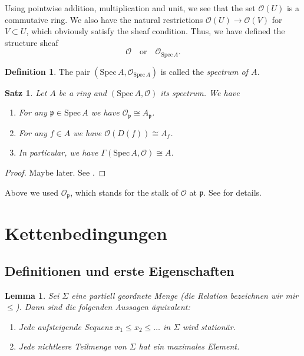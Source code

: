 \documentclass[reqno,12pt]{article}
\numberwithin{equation}{section}
\newcommand{\cO}{\mathcal{O}}
\newcommand{\Spec}{\text{Spec}\,}
\theoremstyle{plain}
\newtheorem{lemma}[thm]{Lemma}
\newtheorem{proposition}[thm]{Satz}
\theoremstyle{definition}
\newtheorem{definition}[thm]{Definition}
\newcommand{\fp}{\mathfrak{p}}
\begin{document}
Using pointwise addition, multiplication and unit, we see that the set $\cO(U)$
is a commutaive ring. We also have the natural restrictions $\cO(U) \to \cO(V)$
for $V \subset U$, which obviously satisfy the sheaf condition. Thus, we have
defined the structure sheaf
\begin{equation*}
  \cO \quad \text{or} \quad \cO_{\Spec A}.
\end{equation*}


\begin{definition}
  The pair $(\Spec A, \cO_{\Spec A})$ is called the \emph{spectrum of $A$.}
\end{definition}


\begin{proposition}\label{proposition:spec-A-structure-sheaf}
  Let $A$ be a ring and $(\Spec A, \cO)$ its spectrum. We have
  \begin{enumerate}
    \item For any $\fp \in \Spec A$ we have $\cO_{\fp} \cong A_{\fp}$.

    \item For any $f \in A$ we have $\cO(D(f)) \cong A_f$.

    \item In particular, we have $\Gamma(\Spec A, \cO) \cong A$.
  \end{enumerate}
\end{proposition}

\begin{proof}
  Maybe later. See \cite[Chapter II, Proposition 2.2]{Ha}.
\end{proof}

Above we used $\cO_{\fp}$, which stands for the stalk of $\cO$ at $\fp$.
See \cite[p.~62]{Ha} for details.

\newpage
\section{Kettenbedingungen}

\subsection{Definitionen und erste Eigenschaften}
\begin{lemma}\label{lemma-poset-chain-conditions}
Sei $\Sigma$ eine partiell geordnete Menge (die Relation bezeichnen wir mir $\leq$). Dann sind die folgenden Aussagen äquivalent:
\begin{enumerate}
\item Jede aufsteigende Sequenz $x_1 \leq x_2 \leq \dots$ in $\Sigma$ wird stationär.
\item Jede nichtleere Teilmenge von $\Sigma$ hat ein maximales Element.
\end{enumerate}
\end{lemma}
\end{document}
